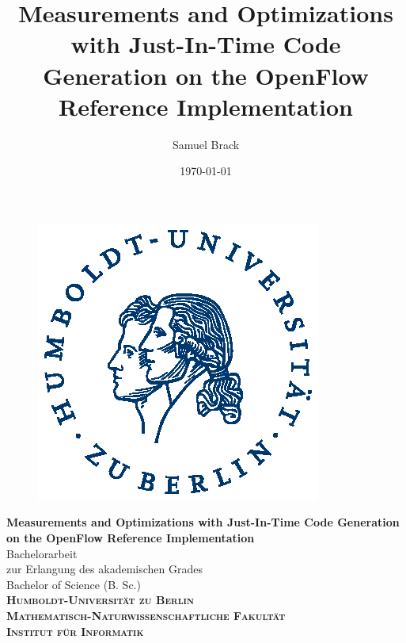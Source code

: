 \documentclass[a4paper,
		12pt,
		parskip=full,
		titlepage
		]{scrartcl}
\title{Measurements and Optimizations with Just-In-Time Code Generation on the OpenFlow Reference Implementation}
\author{Samuel Brack}
\date{\today}
\begin{document}
\thispagestyle{empty}

\hspace{20cm}
\vspace{-3cm}

\begin{figure}[H] \hspace{11cm}
\includegraphics[width=3.2 cm]{HU_Logo}
\end{figure}
\begin{center}
  \huge{\bf Measurements and Optimizations with Just-In-Time Code Generation on the OpenFlow Reference Implementation} \\ %
  \vspace{1cm}
  \LARGE  Bachelorarbeit \\ %
  \vspace{1cm}
  \Large zur Erlangung des akademischen Grades \\
  Bachelor of Science (B. Sc.)\\ %
  \vspace{1.5cm}
  {\large
    \bf{
      \scshape
      Humboldt-Universit\"at zu Berlin \\
      Mathematisch-Naturwissenschaftliche Fakult\"at \\
      Institut f\"ur Informatik\\
    }
  } 
\enlargethispage{10\baselineskip}
\end{center}
\vspace {1 cm}%
\end{document}
